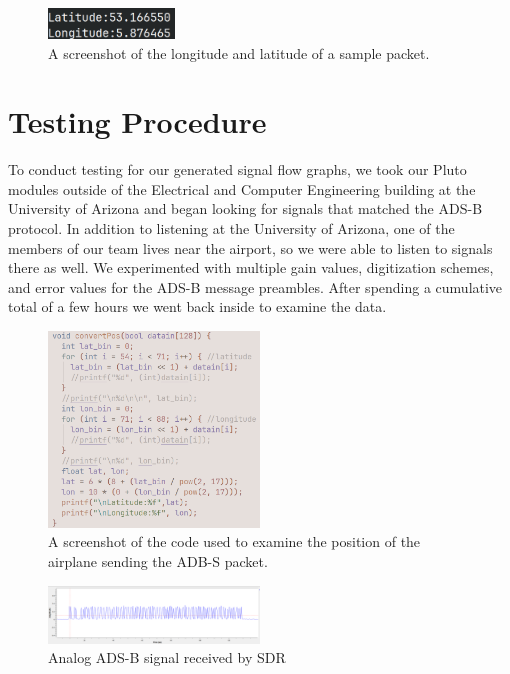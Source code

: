 \documentclass[conference, onecolumn]{IEEEtran}
\begin{document}
\begin{figure}
  \begin{center}
    \includegraphics[width=0.3\textwidth]{./figures/fig_output_decode.png}
  \end{center}
  \caption{A screenshot of the longitude and latitude of a sample packet.}\label{fig:decode-position-adbs}
\end{figure}


\section{Testing Procedure}
To conduct testing for our generated signal flow graphs, we took our Pluto modules outside of the Electrical and Computer Engineering building at the University of Arizona and began looking for signals that matched the ADS-B protocol. In addition to listening at the University of Arizona, one of the members of our team lives near the airport, so we were able to listen to signals there as well. We experimented with multiple gain values, digitization schemes, and error values for the ADS-B message preambles. After spending a cumulative total of a few hours we went back inside to examine the data.

\begin{figure}
  \begin{center}
    \includegraphics[width=0.5\textwidth]{./figures/fig_decode_position.png}
  \end{center}
  \caption{A screenshot of the code used to examine the position of the airplane sending the ADB-S packet.}\label{fig:decode-position-adbs}
\end{figure}

\begin{figure}
  \begin{center}
    \includegraphics[width=0.5\textwidth]{./figures/fig_ADSB_recv_analog.png}
  \end{center}
  \caption{Analog ADS-B signal received by SDR}\label{fig:analog_rec}
\end{figure}
\end{document}

